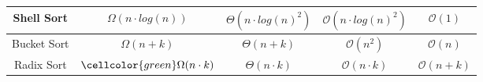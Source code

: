 \documentclass[10pt,landscape,a4paper, table]{extarticle}
\begin{document}
\begin{multicols*}{3}
\begin{tabular}{|c | c c c | c|}
        Shell Sort & \cellcolor{orange} $\Omega(n\cdot log(n))$ & \cellcolor{red} $\Theta(n \cdot log(n)^2)$ & \cellcolor{red} $\mathcal{O}(n \cdot log(n)^2)$ & \cellcolor{green} $\mathcal{O}(1)$ \\ \hline
        Bucket Sort & \cellcolor{green} $\Omega(n+k)$ & \cellcolor{green} $\Theta(n+k)$ & \cellcolor{green} $\mathcal{O}(n^2)$ & \cellcolor{red} $\mathcal{O}(n)$ \\ \hline
        Radix Sort & \cellcolor{green} $\cellcolor{green} \Omega(n \cdot k)$ & \cellcolor{green} $\Theta(n \cdot k)$ & \cellcolor{green} $\mathcal{O}(n \cdot k)$ & \cellcolor{yellow} $\mathcal{O}(n+k)$ \\ \hline
\end{tabular}
\endgroup



\end{multicols*}
\end{document}
